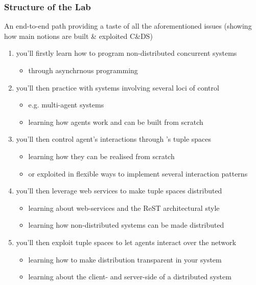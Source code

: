 \documentclass[handout]{beamer}\mode<presentation>{\usetheme{AMSCesenaPurpleAndGold}}
\begin{document}
\begin{frame}[allowframebreaks]
	\frametitle{Structure of the Lab}
	
	An end-to-end path providing a taste of all the aforementioned issues (showing how main notions are built \& exploited C\&DS)
	\medskip
	\begin{enumerate}
		\item you'll firstly learn how to program non-distributed concurrent systems
		\begin{itemize}
			\item through \alert{asynchrnous programming}
		\end{itemize}
	
		\medskip
	
		\item you'll then practice with systems involving several loci of control
		\begin{itemize}
			\item e.g. \alert{multi-agent systems}
			\item learning how \jade{} agents work and can be built from scratch
		\end{itemize}
	
		\medskip
		
		\item you'll then control agent's interactions through \alert{\linda{}'s tuple spaces}
		\begin{itemize}
			\item learning how they can be realised from scratch
			\item or exploited in flexible ways to implement several \alert{interaction patterns}
		\end{itemize}
		
		\framebreak
		
		\item you'll then leverage \alert{web services} to make tuple spaces distributed
		\begin{itemize}
			\item learning about web-services and the ReST architectural style
			\item learning how non-distributed systems can be made distributed
		\end{itemize}
		
		\medskip
		
		\item you'll then exploit tuple spaces to let agents interact \alert{over the network}
		\begin{itemize}
			\item learning how to make distribution transparent in your system
			\item learning about the client- and server-side of a distributed system
		\end{itemize}
	

\end{enumerate}
\end{frame}
\end{document}
